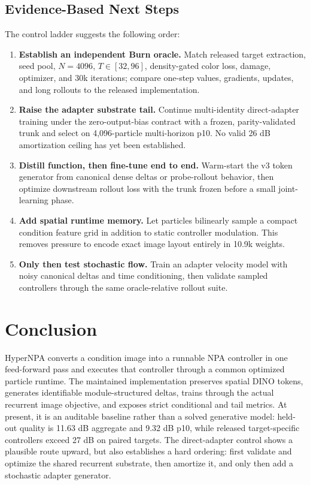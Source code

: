 \documentclass[sigconf,nonacm]{acmart}
\begin{document}
\subsection{Evidence-Based Next Steps}

The control ladder suggests the following order:
\begin{enumerate}
  \item \textbf{Establish an independent Burn oracle.} Match released target
  extraction, seed pool, $N=4096$, $T\in[32,96]$, density-gated color loss,
  damage, optimizer, and 30k iterations; compare one-step values, gradients,
  updates, and long rollouts to the released implementation.
  \item \textbf{Raise the adapter substrate tail.} Continue multi-identity
  direct-adapter training under the zero-output-bias contract with a frozen,
  parity-validated trunk and select on 4,096-particle multi-horizon p10. No
  valid 26 dB amortization ceiling has yet been established.
  \item \textbf{Distill function, then fine-tune end to end.} Warm-start the
  v3 token generator from canonical dense deltas or probe-rollout behavior,
  then optimize downstream rollout loss with the trunk frozen before a small
  joint-learning phase.
  \item \textbf{Add spatial runtime memory.} Let particles bilinearly sample a
  compact condition feature grid in addition to static controller modulation.
  This removes pressure to encode exact image layout entirely in 10.9k weights.
  \item \textbf{Only then test stochastic flow.} Train an adapter velocity
  model with noisy canonical deltas and time conditioning, then validate sampled
  controllers through the same oracle-relative rollout suite.
\end{enumerate}

\section{Conclusion}

HyperNPA converts a condition image into a runnable NPA controller in one
feed-forward pass and executes that controller through a common optimized
particle runtime. The maintained implementation preserves spatial DINO tokens,
generates identifiable module-structured deltas, trains through the actual
recurrent image objective, and exposes strict conditional and tail metrics.
At present, it is an auditable baseline rather than a solved generative model:
held-out quality is 11.63 dB aggregate and 9.32 dB p10, while released
target-specific controllers exceed 27 dB on paired targets. The direct-adapter
control shows a plausible route upward, but also establishes a hard ordering:
first validate and optimize the shared recurrent substrate, then amortize it,
and only then add a stochastic adapter generator.
\end{document}
